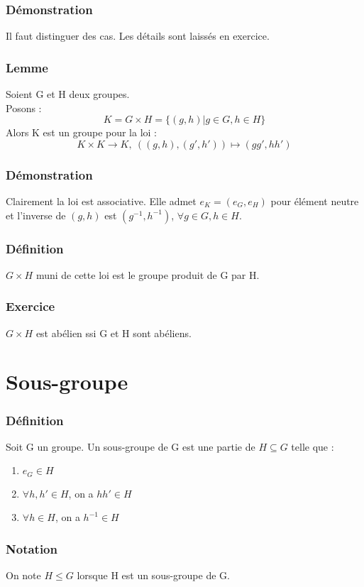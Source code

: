 \documentclass[a4paper, oneside]{report}
\newcommand{\x}{\times}
\begin{document}
\subsubsection{Démonstration}
Il faut distinguer des cas. Les détails sont laissés en exercice.

\subsubsection{Lemme}
Soient G et H deux groupes.\\
Posons :
$$K=G\x H=\{(g,h)|g\in G, h\in H \}$$
Alors K est un groupe pour la loi :
$$K\x K \rightarrow K,~((g,h),(g',h'))\mapsto (gg',hh')$$

\subsubsection{Démonstration}
Clairement la loi est associative. Elle admet $e_K=(e_G,e_H)$ pour élément neutre et l'inverse de $(g,h)$ est $(g^{-1}, h^{-1})$, $\forall g\in G, h\in H$.\\

\subsubsection{Définition}
$G\x H$ muni de cette loi est le groupe produit de G par H.\\

\subsubsection{Exercice}
$G\x H$ est abélien ssi G et H sont abéliens.

\section{Sous-groupe}
\subsubsection{Définition}
Soit G un groupe. Un sous-groupe de G est une partie de $H\subseteq G$ telle que :
\begin{enumerate}
\item $e_G \in H$
\item $\forall h,h' \in H$, on a $hh' \in H$
\item $\forall h\in H$, on a $h^{-1}\in H$
\end{enumerate}

\subsubsection{Notation}
On note $H\leq G$ lorsque H est un sous-groupe de G.\\
\end{document}
